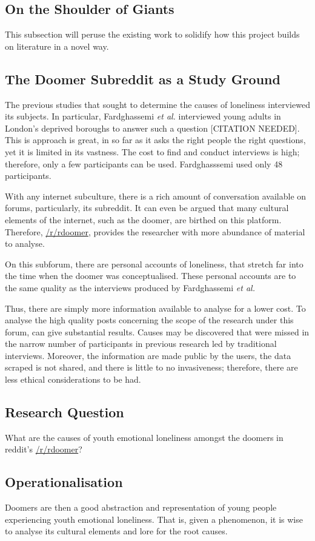 \documentclass[../report.tex]{subfiles}
\begin{document}
\subsection{On the Shoulder of Giants}
This subsection will peruse the existing work to solidify how this project builds on literature in a novel way. 


\subsection{The Doomer Subreddit as a Study Ground}

The previous studies that sought to determine the causes of loneliness interviewed its subjects.
In particular, Fardghassemi \textit{et al.} interviewed young adults in London's deprived boroughs to answer such a question [CITATION NEEDED].  
This is approach is great, in so far as it asks the right people the right questions, yet it is limited in its vastness. 
The cost to find and conduct interviews is high; therefore, only a few participants can be used.
Fardghasssemi used only 48 participants. 

With any internet subculture, there is a rich amount of conversation available on forums, particularly, its subreddit. 
It can even be argued that many cultural elements of the internet, such as the doomer, are birthed on this platform.
Therefore, 
\href{www.reddit.com/r/doomer}{/r/rdoomer},
provides the researcher with more abundance of material to analyse.

On this subforum, there are personal accounts of loneliness, that stretch far into the time when the doomer was conceptualised. 
These personal accounts are to the same quality as the interviews produced by Fardghassemi \textit{et al.}

Thus, there are simply more information available to analyse for a lower cost. To analyse the high quality posts concerning the scope of the research under this forum, can give substantial results.
Causes may be discovered that were missed in the narrow number of participants in previous research led by traditional interviews.
Moreover, the information are made public by the users, the data scraped is not shared, and there is little to no invasiveness; therefore, there are less ethical considerations to be had.

\subsection{Research Question}

What are the causes of youth emotional loneliness amongst the doomers in reddit's
\href{www.reddit.com/r/doomer}{/r/rdoomer}?

\subsection{Operationalisation}

Doomers are then a good abstraction and representation of young people experiencing youth emotional loneliness. 
That is, given a phenomenon, it is wise to analyse its cultural elements and lore for the root causes. 
\end{document}
